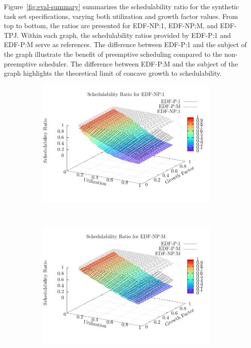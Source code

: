 Figure~\ref{fig:eval-summary} summarizes the schedulability ratio
for the synthetic task set specifications, varying both
utilization and growth factor values. From top to bottom, the ratios
are presented for EDF-NP:1, EDF-NP:M, and EDF-TPJ. Within each graph, the
schedulability ratios provided by EDF-P:1 and EDF-P:M serve as
references. The difference between EDF-P:1 and the subject of the
graph illustrate the benefit of preemptive scheduling compared to the
non-preemptive scheduler. The difference between EDF-P:M and the
subject of the graph highlights the theoretical limit of concave
growth to schedulability. 

\begin{figure}[hb]
  \center
  \begin{subfigure}[t]{.32\linewidth}
    \includegraphics[width=\linewidth]{plot/avg-alg-sched/avg-ratio-NP-1}
  \end{subfigure}~
  \begin{subfigure}[t]{.32\linewidth}
    \includegraphics[width=\linewidth]{plot/avg-alg-sched/avg-ratio-NP-m}

\end{subfigure}
\end{figure}
